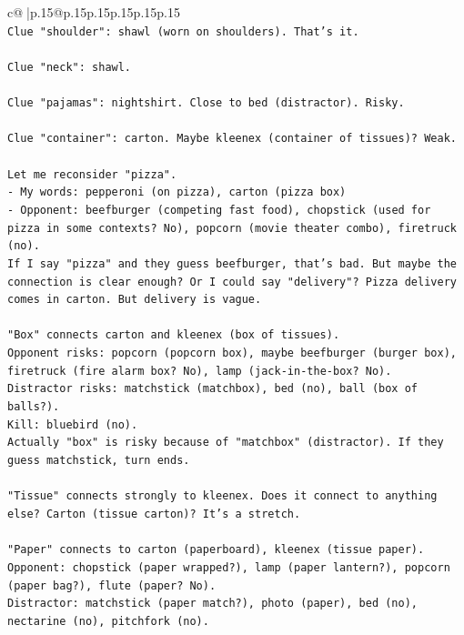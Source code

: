 \documentclass{article}
\begin{document}
{\begin{supertabular}{c@{$\;$}|p{.15\linewidth}@{}p{.15\linewidth}p{.15\linewidth}p{.15\linewidth}p{.15\linewidth}p{.15\linewidth}}
{{{\\ 
\texttt{Clue "shoulder": shawl (worn on shoulders). That's it.} \\
\\ 
\texttt{Clue "neck": shawl.} \\
\\ 
\texttt{Clue "pajamas": nightshirt. Close to bed (distractor). Risky.} \\
\\ 
\texttt{Clue "container": carton. Maybe kleenex (container of tissues)? Weak.} \\
\\ 
\texttt{Let me reconsider "pizza". } \\
\texttt{{-} My words: pepperoni (on pizza), carton (pizza box)} \\
\texttt{{-} Opponent: beefburger (competing fast food), chopstick (used for pizza in some contexts? No), popcorn (movie theater combo), firetruck (no).} \\
\texttt{If I say "pizza" and they guess beefburger, that's bad. But maybe the connection is clear enough? Or I could say "delivery"? Pizza delivery comes in carton. But delivery is vague.} \\
\\ 
\texttt{"Box" connects carton and kleenex (box of tissues).} \\
\texttt{Opponent risks: popcorn (popcorn box), maybe beefburger (burger box), firetruck (fire alarm box? No), lamp (jack{-}in{-}the{-}box? No).} \\
\texttt{Distractor risks: matchstick (matchbox), bed (no), ball (box of balls?).} \\
\texttt{Kill: bluebird (no).} \\
\texttt{Actually "box" is risky because of "matchbox" (distractor). If they guess matchstick, turn ends.} \\
\\ 
\texttt{"Tissue" connects strongly to kleenex. Does it connect to anything else? Carton (tissue carton)? It's a stretch.} \\
\\ 
\texttt{"Paper" connects to carton (paperboard), kleenex (tissue paper). } \\
\texttt{Opponent: chopstick (paper wrapped?), lamp (paper lantern?), popcorn (paper bag?), flute (paper? No).} \\
\texttt{Distractor: matchstick (paper match?), photo (paper), bed (no), nectarine (no), pitchfork (no).} \\
}}}
\end{supertabular}}
\end{document}
